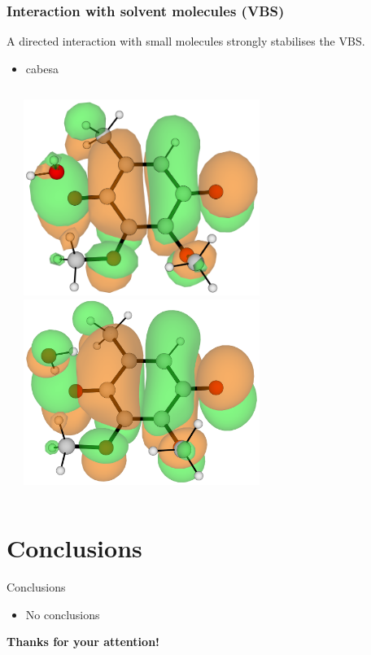 \documentclass[9pt,t,xcolor=table]{beamer}
\begin{document}
\begin{frame}
	\frametitle{\huge Interaction with solvent molecules (VBS)}\large
	A directed interaction with small molecules strongly stabilises the VBS.\\
	\begin{itemize}
		\item cabesa
	\end{itemize}
	\vspace{5pt}
	\begin{columns}[c]
		\begin{column}{0.7\textwidth}
			\centering
			\small	
			
		\end{column}
		\hspace{40pt}
		\begin{column}{0.3\textwidth}
			\centering
	 		\includegraphics[width=0.6\textwidth]{Figs/Q0_H2O_VBS.png}\\
			\vfill
			\includegraphics[width=0.6\textwidth]{Figs/Q0_H2O_H_VBS.png}	
		\end{column}
	\end{columns}		
\end{frame}

\section{Conclusions}
\begin{frame}{\huge Conclusions}\large
	\begin{itemize}
		\item No conclusions
	\end{itemize}
	\centering
	\vspace{40pt}
	\Huge \textcolor{kul-blue}{\textbf{Thanks for your attention!}}
\end{frame}
\end{document}
